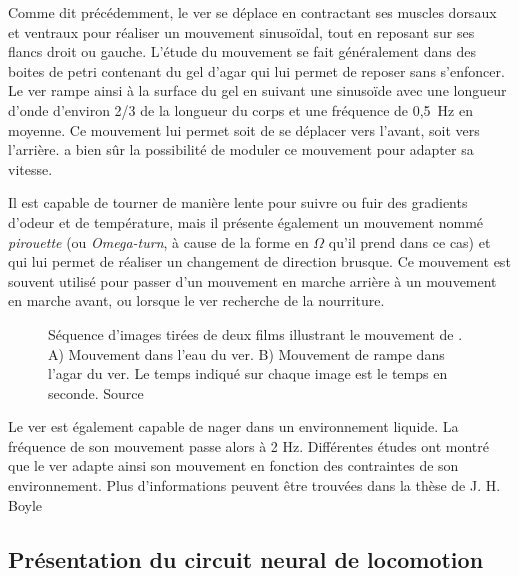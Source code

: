Comme dit précédemment, le ver se déplace en contractant ses muscles dorsaux et
ventraux pour réaliser un mouvement sinusoïdal, tout en reposant sur ses
flancs droit ou gauche. L'étude du mouvement se fait généralement dans des
boites de petri contenant du gel d'agar qui lui permet de reposer
sans s'enfoncer. Le ver rampe ainsi à la surface du gel en suivant une
sinusoïde avec une longueur d'onde d'environ 2/3 de la longueur du corps et 
une fréquence de 0,5~Hz en moyenne\cite{Boyle2009}. Ce mouvement lui permet
soit de se déplacer vers l'avant, soit vers l'arrière. \celeg{} a bien sûr
la possibilité de moduler ce mouvement pour adapter sa vitesse.

Il est capable de tourner de manière lente pour suivre ou fuir des gradients
d'odeur et de température, mais il présente également un mouvement nommé
\textit{pirouette} (ou \textit{Omega-turn}, à cause de la forme en $\Omega$ qu'il
prend dans ce cas) et qui lui permet de réaliser un changement de direction
brusque. Ce mouvement est souvent utilisé pour passer d'un mouvement en marche
arrière à un mouvement en marche avant, ou lorsque le ver recherche de la
nourriture.\\

\begin{figure}[ht]
   \begin{center}
   \end{center}
   \caption[Séquence d'image du mouvement de \celeg{}]{Séquence d'images tirées de deux films illustrant le mouvement de
   \celeg{}. A) Mouvement dans l'eau du ver. B) Mouvement de rampe dans l'agar du ver. Le
   temps indiqué sur chaque image est le temps en seconde. Source \boylecite{}}
   \label{fig:celegans_mouvement}
\end{figure}

Le ver est également capable de nager dans un environnement liquide. La fréquence
de son mouvement passe alors à 2 Hz. Différentes études ont montré que le ver
adapte ainsi son mouvement en fonction des contraintes de son environnement.
Plus d'informations peuvent être trouvées dans la thèse de J. H. Boyle \cite{Boyle2009}


\subsection{Présentation du circuit neural de locomotion} %
\label{sub:Présentation du circuit neural de locomotion}

